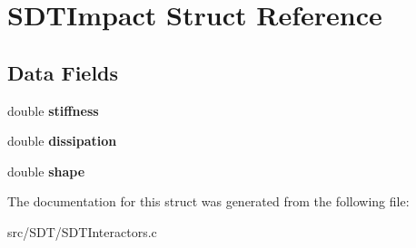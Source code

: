 \hypertarget{struct_s_d_t_impact}{}\section{S\+D\+T\+Impact Struct Reference}
\label{struct_s_d_t_impact}
\subsection*{Data Fields}
\begin{DoxyCompactItemize}
\item 
\hypertarget{struct_s_d_t_impact_a9e58169b625b632c35218c00425d2b87}{}double {\bfseries stiffness}\label{struct_s_d_t_impact_a9e58169b625b632c35218c00425d2b87}

\item 
\hypertarget{struct_s_d_t_impact_a56d6259aa049232668739998678cce42}{}double {\bfseries dissipation}\label{struct_s_d_t_impact_a56d6259aa049232668739998678cce42}

\item 
\hypertarget{struct_s_d_t_impact_aa45a20e816e161660b8c2697a5b4bb46}{}double {\bfseries shape}\label{struct_s_d_t_impact_aa45a20e816e161660b8c2697a5b4bb46}

\end{DoxyCompactItemize}


The documentation for this struct was generated from the following file\+:\begin{DoxyCompactItemize}
\item 
src/\+S\+D\+T/S\+D\+T\+Interactors.\+c\end{DoxyCompactItemize}
